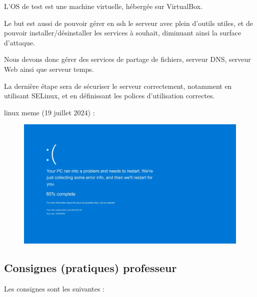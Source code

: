 \documentclass{article}
\begin{document}
L'OS de test est une machine virtuelle, hébergée sur VirtualBox. 
	
	Le but est aussi de pouvoir gérer en ssh le serveur avec plein d'outils utiles, et de pouvoir installer/désinstaller les services à souhait, diminuant ainsi la surface d'attaque.
	
	Nous devons donc gérer des services de partage de fichiers, serveur DNS, serveur Web ainsi que serveur temps.
	
	La dernière étape sera de sécuriser le serveur correctement, notamment en utilisant SELinux, et en définissant les polices d'utilisation correctes.
	
\begin{center}linux meme (19 juillet 2024) :
\end{center}
\begin{figure}[h]
\centering
\includegraphics[width=1\textwidth]{meme.png}
\label{fig:meme}
\end{figure}
\newpage
	
\subsection{Consignes (pratiques) professeur}
	
Les consignes sont les suivantes : 
	
\end{document}
